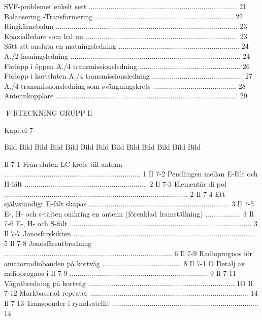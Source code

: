 \documentclass[a4paper,twoside,twocolumn,openright]{book}
\begin{document}
{{{{{{{{{{{SVF-problemet enkelt sett ........................................................................... 21
Balansering -Transformering ...................................................................... 22
Ringkärnebalun ............................................................................................ 23
Koaxialledare som bal un ............................................................................. 23
Sätt att ansluta en matningsledning ............................................................. 24
A./2-fasningsledning ...................................................................................... 24
Förlopp i öppen A./4 transmissionsledning ................................................... 26
Förlopp i kortsluten A./4 transmissionsledning .............................................. 27
A./4 transmissionsledning som svängningskrets .......................................... 28
Antennkopplare ............................................................................................ 29

F RTECKNING
GRUPP Il

Kapitel 7-

Bild
Bild
Bild
Bild
Bild
Bild
Bild
Bild
Bild
Bild
Bild
Bild
Bild

Il 7-1
Från sluten LC-krets till antenn ..................................................................... 1
Il 7-2
Pendlingen mellan E-fält och H-fält .............................................................. 2
Il 7-3
Elementär di pol ............................................................................................. 2
Il 7-4
Ett självständigt E-fält skapas ....................................................................... 3
Il 7-5
E-, H- och s-tälten omkring en antenn (förenklad framställning) .................. 3
Il 7-6
E-, H- och S-fält ............................................................................................ 3
Il 7-7
Jonosfärskikten ............................................................................................. 5
Il 7-8
Jonosfärsutbredning ..................................................................................... 6
Il 7-9
Radioprognos för amatörradiobanden på kortvåg ........................................ 8
Il 7-1 O Detalj av radioprognos i Il 7-9 ...................................................................... 9
Il 7-11 Vågutbredning på kortvåg .......................................................................... 1O
Il 7-12 Markbaserad repeater ................................................................................ 14
Il 7-13 Transponder i rymdsatellit .......................................................................... 14

}}}}}}}}}}}
\end{document}
